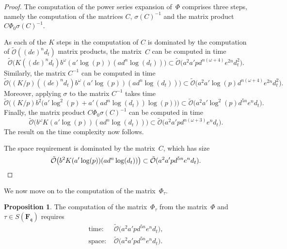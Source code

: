 \documentclass[a4paper,11pt]{article}
\numberwithin{equation}{section}
\newcommand{\FF}{\mathbf{F}} %
\providecommand{\SoftOh}{\tilde{\mathcal{O}}} %
\theoremstyle{definition}
\newtheorem{prop}[thm]{Proposition}
\begin{document}
\begin{proof}
The computation of the power series expansion of~$\Phi$ comprises 
three steps, namely the computation of the matrices $C$, $\sigma(C)^{-1}$ 
and the matrix product $C \Phi_0 \sigma(C)^{-1}$.

As each of the $K$ steps in the computation of $C$ is dominated by the 
computation of $\SoftOh((de)^n d_t)$ matrix products, the matrix~$C$ can be 
computed in time 
\begin{equation*}
\SoftOh\bigl(K ((de)^n d_t) b^{\omega} (a' \log (p)) (a d^n \log (d_t))\bigr) 
    \subset \SoftOh\bigl(a^2 a' p d^{n(\omega + 4)} e^{2n} d_t^2 \bigr).
\end{equation*}
Similarly, the matrix $C^{-1}$ can be computed in time 
\begin{equation*}
\SoftOh\bigl( (K/p) ((de)^n d_t) b^{\omega} (a' \log (p)) (ad^n \log (d_t)) \bigr)
    \subset \SoftOh\bigl( a^2 a' \log(p) d^{n(\omega+4)} e^{2n} d_t^2 \bigr). 
\end{equation*}
Moreover, applying $\sigma$ to the matrix $C^{-1}$ takes time 
\begin{equation*}
\SoftOh\bigl( (K/p) b^2 \bigl(a' \log^2(p) + a' (a d^n \log(d_t)) \log(p) \bigl) \bigr)
\subset \SoftOh\bigl( a^2 a' \log^2(p) d^{5n} e^n d_t \bigr).
\end{equation*}
Finally, the matrix product 
$C \Phi_0 \sigma(C)^{-1}$ can be computed in time 
\begin{equation*}
\SoftOh\bigl( b^{\omega} K (a' \log(p)) (a d^n \log(d_t)) \bigr) 
    \subset \SoftOh\bigl( a^2 a' p d^{n(\omega + 3)} e^n d_t \bigr).
\end{equation*}
The result on the time complexity now follows.

The space requirement is dominated by the matrix~$C$, which has size
\begin{equation*}
\SoftOh\bigl(b^2 K (a' \log(p)) (a d^n \log(d_t))\bigr) 
    \subset \SoftOh(a^2 a' p d^{5n} e^n d_t). \qedhere
\end{equation*}
\end{proof}

We now move on to the computation of the matrix~$\Phi_{\tau}$.

\begin{prop}
The computation of the matrix~$\Phi_{\tau}$ from the matrix~$\Phi$ 
and $\tau \in S(\FF_{\mathfrak{q}})$ requires
\begin{align*}
\mbox{time: }  &\SoftOh\bigl(a^2 a' p d^{5n} e^n d_t \bigr), \\ 
\mbox{space: } &\SoftOh\bigl(a^2 a' p d^{5n} e^n d_t \bigr).
\end{align*}
\end{prop}
\end{document}
